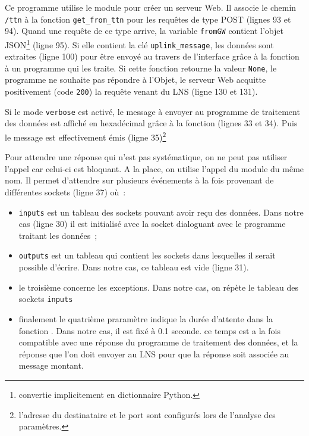          \vspace{1em}

 
 Ce programme utilise le module  pour créer un serveur Web. Il associe le chemin \texttt{/ttn} à la fonction \texttt{get\_from\_ttn} pour les requêtes de type POST (lignes 93 et 94). Quand une requête de ce type arrive, la variable 
\texttt{fromGW} contient l'objet JSON\footnote{convertie implicitement en dictionnaire Python.} (ligne 95). Si elle contient la clé \texttt{uplink\_message}, les données sont extraites (ligne 100) pour être envoyé au travers de l'interface \textit{}  grâce à la fonction \texttt{} à un programme qui les traite. Si cette fonction retourne la valeur \texttt{None}, le programme ne souhaite pas répondre à l'Objet, le serveur Web acquitte positivement (code \texttt{200}) la requête venant du LNS (ligne 130 et 131).

\label{chap—forward-data}


Si le mode \texttt{verbose} est activé, le message à envoyer au programme de traitement des données est affiché en hexadécimal grâce à la fonction  (lignes 33 et 34). Puis le message est effectivement émis (ligne 35)\footnote{l'adresse du destinataire et le port sont configurés lors de l'analyse des paramètres.}

Pour attendre une réponse qui n'est pas systématique, on ne peut pas utiliser l'appel  car celui-ci est bloquant. A la place, on utilise l'appel  du module du même nom. Il permet d'attendre sur plusieurs événements à la fois provenant de différentes sockets (ligne 37) où~:
\begin{itemize}
    \item \texttt{inputs} est un tableau des sockets pouvant avoir reçu des données. Dans notre cas (ligne 30) il est initialisé avec la socket dialoguant avec le programme traitant les données~;
    \item \texttt{outputs} est un tableau qui contient les sockets dans lesquelles il serait possible d'écrire. Dans notre cas, ce tableau est vide (ligne 31).
    \item le troisième concerne les exceptions. Dans notre cas, on répète le tableau des sockets \texttt{inputs}
    \item finalement le quatrième praramètre indique la durée d'attente dans la fonction . Dans notre cas, il est fixé à 0.1 seconde. ce temps est a la fois compatible avec une réponse du programme de traitement des données, et la réponse que l'on doit envoyer au LNS pour que la réponse soit associée au message montant.
\end{itemize}

